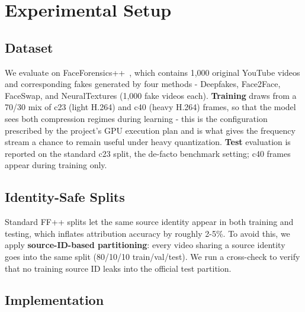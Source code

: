 \section{Experimental Setup}

\subsection{Dataset}
We evaluate on FaceForensics++~\cite{rossler2019faceforensics}, which contains 1,000 original YouTube videos and corresponding fakes generated by four methods - Deepfakes, Face2Face, FaceSwap, and NeuralTextures (1,000 fake videos each). \textbf{Training} draws from a 70/30 mix of c23 (light H.264) and c40 (heavy H.264) frames, so that the model sees both compression regimes during learning - this is the configuration prescribed by the project's GPU execution plan and is what gives the frequency stream a chance to remain useful under heavy quantization. \textbf{Test} evaluation is reported on the standard c23 split, the de-facto benchmark setting; c40 frames appear during training only.

\subsection{Identity-Safe Splits}
Standard FF++ splits let the same source identity appear in both training and testing, which inflates attribution accuracy by roughly 2-5\%. To avoid this, we apply \textbf{source-ID-based partitioning}: every video sharing a source identity goes into the same split (80/10/10 train/val/test). We run a cross-check to verify that no training source ID leaks into the official test partition.

\subsection{Implementation}

